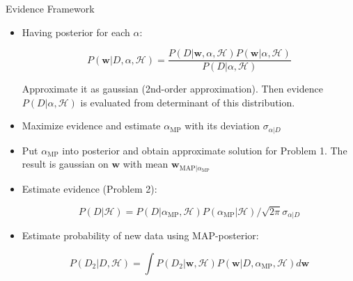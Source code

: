 \documentclass[10pt]{beamer}
\theoremstyle{definition}
\begin{document}
	\begin{frame}{Evidence Framework}
		
		\begin{itemize}
			\item Having posterior for each $ \alpha $:
			
			\begin{equation*}
				P(\mathbf{w} | D, \alpha, \mathcal{H}) = \frac{P(D | \mathbf{w}, \alpha, \mathcal{H}) P(\mathbf{w} | \alpha, \mathcal{H})}{P(D | \alpha, \mathcal{H})}
			\end{equation*}
			
			Approximate it as gaussian (2nd-order approximation). Then evidence $ P(D | \alpha, \mathcal{H}) $ is evaluated from determinant of this distribution.
			
			\item Maximize evidence and estimate $ \alpha_{\text{MP}} $ with its deviation $ \sigma_{\alpha | D} $
			
			\item Put $ \alpha_{\text{MP}} $ into posterior and obtain approximate solution for Problem 1. The result is gaussian on $ \mathbf{w} $ with mean $ \mathbf{w}_{\text{MAP} | \alpha_{\text{MP}}} $
			
			\item Estimate evidence (Problem 2):
			
			\begin{equation*}
				P(D | \mathcal{H}) = P(D | \alpha_{\text{MP}}, \mathcal{H}) P(\alpha_{\text{MP}} | \mathcal{H}) / \sqrt{2 \pi} \sigma_{\alpha | D}
			\end{equation*}
			
			\item Estimate probability of new data using MAP-posterior:
			
			\begin{equation*}
				P(D_2 | D, \mathcal{H}) = \int P(D_2 | \mathbf{w}, \mathcal{H}) P(\mathbf{w} | D, \alpha_{\text{MP}}, \mathcal{H}) d\mathbf{w}
			\end{equation*}
			
		\end{itemize}
		
	\end{frame}
	
\end{document}
